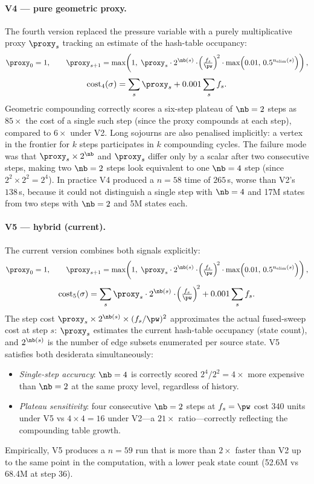 \paragraph{V4 — pure geometric proxy.}
The fourth version replaced the pressure variable with a purely
multiplicative proxy $\proxy_s$ tracking an estimate of the hash-table
occupancy:
\[
  \proxy_0 = 1, \qquad
  \proxy_{s+1} = \max\!\left(1,\; \proxy_s
      \cdot 2^{\nb(s)} \cdot \!\left(\tfrac{f_s}{\pw}\right)^{\!2}
      \cdot \max\!\left(0.01,\, 0.5^{n_\mathrm{elim}(s)}\right)\right),
\]
\[
  \mathrm{cost}_4(\sigma) = \sum_s \proxy_s + 0.001 \sum_s f_s.
\]
Geometric compounding correctly scores a six-step plateau of
$\nb=2$ steps as $85\times$ the cost of a single such step (since
the proxy compounds at each step), compared to $6\times$ under V2.
Long sojourns are also penalised implicitly: a vertex in the frontier
for $k$ steps participates in $k$ compounding cycles.
The failure mode was that $\proxy_s \times 2^{\nb}$ and $\proxy_s$
differ only by a scalar after two consecutive steps, making two
$\nb=2$ steps look equivalent to one $\nb=4$ step (since
$2^2 \times 2^2 = 2^4$).
In practice V4 produced a $n=58$ time of $265$\,s, worse than V2's
$138$\,s, because it could not distinguish a single step with $\nb=4$
and 17M states from two steps with $\nb=2$ and 5M states each.

\paragraph{V5 — hybrid (current).}
The current version combines both signals explicitly:
\[
  \proxy_0 = 1, \qquad
  \proxy_{s+1} = \max\!\left(1,\; \proxy_s
      \cdot 2^{\nb(s)} \cdot \!\left(\tfrac{f_s}{\pw}\right)^{\!2}
      \cdot \max\!\left(0.01,\, 0.5^{n_\mathrm{elim}(s)}\right)\right),
\]
\begin{equation}
  \mathrm{cost}_5(\sigma)
    = \sum_s \proxy_s \cdot 2^{\nb(s)} \cdot \!\left(\tfrac{f_s}{\pw}\right)^{\!2}
      + 0.001 \sum_s f_s.
  \label{eq:cost_fn_v5}
\end{equation}
The step cost $\proxy_s \times 2^{\nb(s)} \times (f_s/\pw)^2$
approximates the actual fused-sweep cost at step $s$:
$\proxy_s$ estimates the current hash-table occupancy (state count),
and $2^{\nb(s)}$ is the number of edge subsets enumerated per source
state.
V5 satisfies both desiderata simultaneously:
\begin{itemize}[nosep]
  \item \emph{Single-step accuracy}: $\nb = 4$ is correctly scored
    $2^4/2^2 = 4\times$ more expensive than $\nb=2$ at the same proxy
    level, regardless of history.
  \item \emph{Plateau sensitivity}: four consecutive $\nb=2$ steps at
    $f_s = \pw$ cost $340$ units under V5 vs $4 \times 4 = 16$ under
    V2---a $21\times$ ratio---correctly reflecting the compounding
    table growth.
\end{itemize}
Empirically, V5 produces a $n=59$ run that is more than $2\times$
faster than V2 up to the same point in the computation, with a lower
peak state count (52.6M vs 68.4M at step 36).

